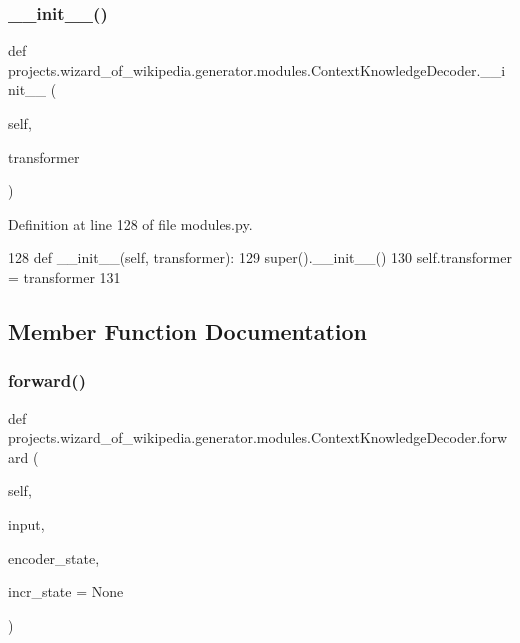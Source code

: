 \subsubsection{\texorpdfstring{\+\_\+\+\_\+init\+\_\+\+\_\+()}{\_\_init\_\_()}}
{\footnotesize\ttfamily def projects.\+wizard\+\_\+of\+\_\+wikipedia.\+generator.\+modules.\+Context\+Knowledge\+Decoder.\+\_\+\+\_\+init\+\_\+\+\_\+ (\begin{DoxyParamCaption}\item[{}]{self,  }\item[{}]{transformer }\end{DoxyParamCaption})}



Definition at line 128 of file modules.\+py.


\begin{DoxyCode}
128     \textcolor{keyword}{def }\_\_init\_\_(self, transformer):
129         super().\_\_init\_\_()
130         self.transformer = transformer
131 
\end{DoxyCode}


\subsection{Member Function Documentation}
\mbox{\label{classprojects_1_1wizard__of__wikipedia_1_1generator_1_1modules_1_1ContextKnowledgeDecoder_ae03a16501c3035669816ceb5eb8678f7}} 
\subsubsection{\texorpdfstring{forward()}{forward()}}
{\footnotesize\ttfamily def projects.\+wizard\+\_\+of\+\_\+wikipedia.\+generator.\+modules.\+Context\+Knowledge\+Decoder.\+forward (\begin{DoxyParamCaption}\item[{}]{self,  }\item[{}]{input,  }\item[{}]{encoder\+\_\+state,  }\item[{}]{incr\+\_\+state = {\ttfamily None} }\end{DoxyParamCaption})}




